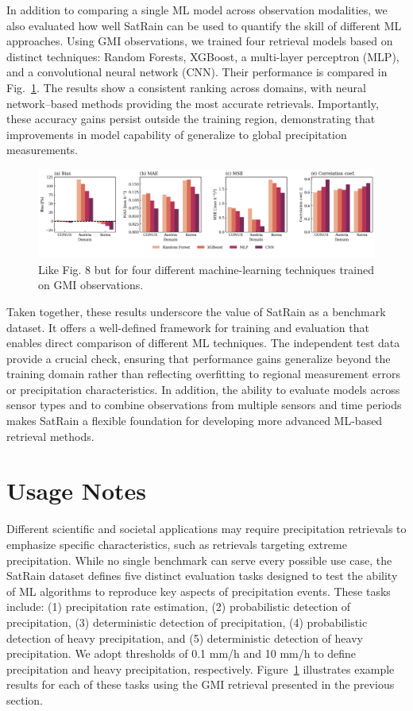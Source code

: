 \documentclass[11pt]{article}
\begin{document}
In addition to comparing a single ML model across observation modalities, we
also evaluated how well SatRain can be used to quantify the skill of different
ML approaches. Using GMI observations, we trained four retrieval models based on
distinct techniques: Random Forests, XGBoost, a multi-layer perceptron (MLP),
and a convolutional neural network (CNN). Their performance is compared in
Fig.~\ref{fig:sensor_comparison}. The results show a consistent ranking across
domains, with neural network–based methods providing the most accurate
retrievals. Importantly, these accuracy gains persist outside the training
region, demonstrating that improvements in model capability of generalize to
global precipitation measurements.

\begin{figure}[htbp]
	\centering
	\includegraphics[width=1.0\textwidth]{figures/fig11}
	\caption{
	  Like Fig. 8 but for four different machine-learning techniques trained on GMI observations.
	}
	\label{fig:sensor_comparison}
\end{figure}

Taken together, these results underscore the value of SatRain as a benchmark
dataset. It offers a well-defined framework for training and evaluation that
enables direct comparison of different ML techniques. The independent test data
provide a crucial check, ensuring that performance gains generalize beyond the
training domain rather than reflecting overfitting to regional measurement
errors or precipitation characteristics. In addition, the ability to evaluate
models across sensor types and to combine observations from multiple sensors and
time periods makes SatRain a flexible foundation for developing more advanced
ML-based retrieval methods.

\section{Usage Notes}

Different scientific and societal applications may require precipitation
retrievals to emphasize specific characteristics, such as retrievals targeting
extreme precipitation. While no single benchmark can serve every possible use
case, the SatRain dataset defines five distinct evaluation tasks designed to
test the ability of ML algorithms to reproduce key aspects of precipitation
events. These tasks include: (1) precipitation rate estimation, (2)
probabilistic detection of precipitation, (3) deterministic detection of
precipitation, (4) probabilistic detection of heavy precipitation, and (5)
deterministic detection of heavy precipitation. We adopt thresholds of 0.1 mm/h
and 10 mm/h to define precipitation and heavy precipitation, respectively.
Figure~\ref{fig:sensor_comparison} illustrates example results for each of these
tasks using the GMI retrieval presented in the previous section.
\end{document}
